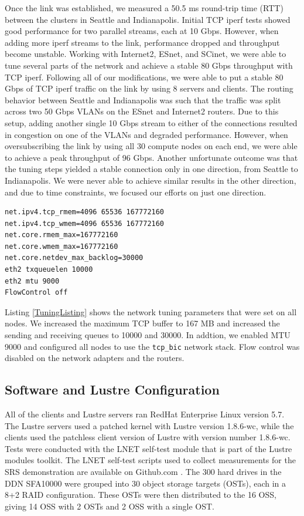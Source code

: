\documentclass[]{sigplan-proc}
\begin{document}
Once the link was established, we measured a 50.5 ms round-trip time (RTT) between the clusters in Seattle and
Indianapolis. Initial TCP iperf tests showed good performance for two parallel streams, each at 10
Gbps. However, when adding more iperf streams to the link, performance dropped and throughput become
unstable. Working with Internet2, ESnet, and SCinet, we were able to tune several parts of the network and
achieve a stable 80 Gbps throughput with TCP iperf. Following all of our modifications, we were able to put a
stable 80 Gbps of TCP iperf traffic on the link by using 8 servers and clients. The routing behavior between
Seattle and Indianapolis was such that the traffic was split across two 50 Gbps VLANs on the ESnet and
Internet2 routers. Due to this setup, adding another single 10 Gbps stream to either of the connections
resulted in congestion on one of the VLANs and degraded performance. However, when oversubscribing the link by
using all 30 compute nodes on each end, we were able to achieve a peak throughput of 96 Gbps. Another
unfortunate outcome was that the tuning steps yielded a stable connection only in one direction, from Seattle
to Indianapolis. We were never able to achieve similar results in the other direction, and due to time
constraints, we focused our efforts on just one direction.

\lstset{language=Bash, caption=Tuning parameters for the network, label=TuningListing}
\begin{lstlisting}
net.ipv4.tcp_rmem=4096 65536 167772160
net.ipv4.tcp_wmem=4096 65536 167772160
net.core.rmem_max=167772160
net.core.wmem_max=167772160
net.core.netdev_max_backlog=30000
eth2 txqueuelen 10000
eth2 mtu 9000
FlowControl off 
\end{lstlisting}

Listing \ref{TuningListing} shows the network tuning parameters that were set on all nodes. We increased the maximum TCP buffer to 167 MB and increased the sending and receiving queues to 10000 and 30000. In addtion, we enabled MTU 9000 and configured all nodes to use the \texttt{tcp\_bic} network stack. Flow control was disabled on the network adapters and the routers.

\subsection{Software and Lustre Configuration}

All of the clients and Lustre servers ran RedHat Enterprise Linux version 5.7. The Lustre servers used a
patched kernel with Lustre version 1.8.6-wc, while the clients used the patchless client version of Lustre with
version number 1.8.6-wc. Tests were conducted with the LNET self-test module that is part of the Lustre modules
toolkit. The LNET self-test scripts used to collect measurements for the SRS demonstration are available on
Github.com \cite{lstgithub2011}. The 300 hard drives in the DDN SFA10000 were grouped into 30 object storage
targets (OSTs), each in a 8+2 RAID configuration. These OSTs were then distributed to the 16 OSS, giving 14
OSS with 2 OSTs and 2 OSS with a single OST.
\end{document}
